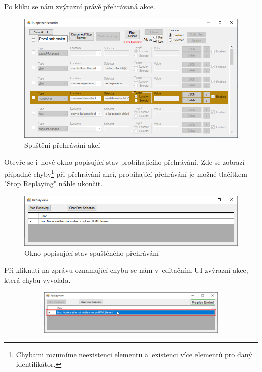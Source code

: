 \documentclass[12pt, a4paper, twoside]{article}
\begin{document}
	Po kliku se nám zvýrazní právě přehrávaná akce. 
	\nopagebreak
	\begin{figure}[H]
		\centering
		\includegraphics[width=1.0\textwidth]{replaying.png}
		\caption{Spuštění přehrávání akcí}
	\end{figure}
	Otevře se i~nové okno popisující stav probíhajícího přehrávání. Zde se zobrazí případné chyby\footnote{Chybami rozumíme neexistenci elementu a~existenci více elementů pro daný identifikátor.} při přehrávání akcí, probíhající přehrávání je možné tlačítkem "Stop Replaying" náhle ukončit. 
	\begin{figure}[H]
		\centering
		\includegraphics[width=1.0\textwidth]{replayView.png}
		\caption{Okno popisující stav spuštěného přehrávání}
	\end{figure}
	\newpage
	Při kliknutí na zprávu oznamující chybu se nám v~editačním UI zvýrazní akce, která chybu vyvolala.
	\begin{figure}[H]
		\centering
		\begin{subfigure}[t]{1.0\textwidth}
			\includegraphics[width=1.0\textwidth]{errorClick.png}
			\caption{}
			\label{subfig:errorClick}
		\end{subfigure}
	\end{figure}
\end{document}
